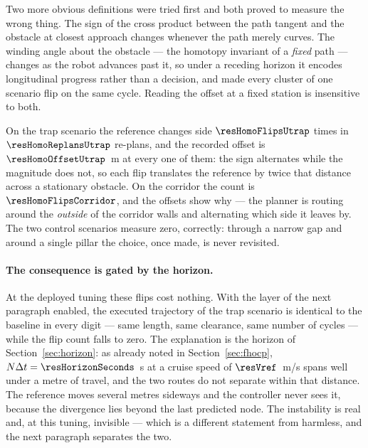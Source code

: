 \documentclass[11pt,a4paper]{article}
\begin{document}
Two more obvious definitions were tried first and both proved to measure the wrong thing. The sign of the
cross product between the path tangent and the obstacle at closest approach changes whenever the path merely
curves. The winding angle about the obstacle --- the homotopy invariant of a \emph{fixed} path --- changes as
the robot advances past it, so under a receding horizon it encodes longitudinal progress rather than a
decision, and made every cluster of one scenario flip on the same cycle. Reading the offset at a fixed
station is insensitive to both.


On the trap scenario the reference changes side $\resHomoFlipsUtrap$ times in $\resHomoReplansUtrap$
re-plans, and the recorded offset is $\resHomoOffsetUtrap$~m at every one of them: the sign alternates while
the magnitude does not, so each flip translates the reference by twice that distance across a stationary
obstacle. On the corridor the count is $\resHomoFlipsCorridor$, and the offsets show why --- the planner is
routing around the \emph{outside} of the corridor walls and alternating which side it leaves by. The two
control scenarios measure zero, correctly: through a narrow gap and around a single pillar the choice, once
made, is never revisited.

\paragraph{The consequence is gated by the horizon.}
At the deployed tuning these flips cost nothing. With the layer of the next paragraph enabled, the executed
trajectory of the trap scenario is identical to the baseline in every digit --- same length, same clearance,
same number of cycles --- while the flip count falls to zero. The explanation is the horizon of
Section~\ref{sec:horizon}: as already noted in Section~\ref{sec:fhocp}, $N\Delta t=\resHorizonSeconds$~s at a
cruise speed of $\resVref$~m/s spans well under a metre of travel, and the two routes do not separate within
that distance. The reference moves several
metres sideways and the controller never sees it, because the divergence lies beyond the last predicted node.
The instability is real and, at this tuning, invisible --- which is a different statement from harmless, and
the next paragraph separates the two.
\end{document}

